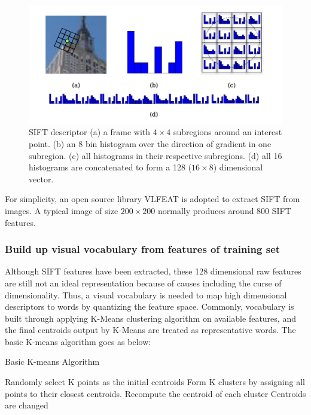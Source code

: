 \begin{figure}[!ht]
\centering
  \includegraphics[width=1\textwidth]{./SIFT_Descriptor.png}
\caption{SIFT descriptor \cite{solem2012programming} (a) a frame with $4 \times 4$ subregions around an interest point. (b) an 8 bin histogram over the direction of gradient in one subregion. (c) all histograms in their respective subregions. (d) all 16 histograms are concatenated to form a 128 ($16 \times 8$) dimensional vector.}
\end{figure}

\noindent For simplicity, an open source library VLFEAT \cite{vedaldi08vlfeat} is adopted to extract SIFT from images. A typical image of size $200 \times 200$ normally produces around 800 SIFT features.  

\subsubsection{Build up visual vocabulary from features of training set}
Although SIFT features have been extracted, these 128 dimensional raw features are still not an ideal representation because of causes including the curse of dimensionality. Thus, a visual vocabulary is needed to map high dimensional descriptors to words by quantizing the feature space. Commonly, vocabulary is built through applying K-Means \cite{lloyd1982least} clustering algorithm on available features, and the final centroids output by K-Means are treated as representative words. The basic K-means algorithm goes as below:

\begin{algorithm}
  \caption{Basic K-means Algorithm}
  \begin {algorithmic}[1]
  \State Randomly select K points as the initial centroids
  \Do 
    \State Form K clusters by assigning all points to their closest centroids.
    \State Recompute the centroid of each cluster
  \doWhile Centroids are changed
  \end{algorithmic}
\end{algorithm}

